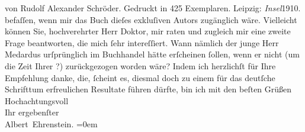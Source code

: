 \begin{ledgroupsized}[t]{13cm}
{{{                     von Rudolf Alexander Schröder. Gedruckt
                     in 425 Exemplaren. Leipzig: \emph{Insel}1910.}}}\label{K_L01912_3h} befaſſen, wenn mir das Buch dieſes exkluſiven Autors zugänglich
               wäre. Vielleicht können Sie, hochverehrter Herr Doktor, mir raten und zugleich mir
               eine zweite Frage beantworten, die mich ſehr intereſſiert. Wann nämlich der junge Herr Medardus urſprünglich im Buchhandel
               hätte erſcheinen ſollen, wenn er nicht (um die Zeit Ihrer \label{K_L01912_4v}\label{K_L01912_4h}?) zurückgezogen worden wäre?\pend
           \pstart
           Indem ich herzlichſt für Ihre Empfehlung danke, die, ſcheint es, diesmal doch zu
               einem für das deutſche Schrifttum erfreulichen Resultate führen dürfte, bin ich mit den beſten Grüßen\pend
           \pstart
           Hochachtungsvoll{\\[\baselineskip]}Ihr ergebenſter{\\[\baselineskip]}\spacefill\mbox{Albert Ehrenstein.}\pend
           \leftskip=0em{}
         
         \endnumbering{}\end{ledgroupsized}  \newcommand{\dateiname}{L01912}\newcommand{\titel}{Albert Ehrenstein an Arthur Schnitzler, 10. 2. 1910}\newcommand{\editorInnen}{Martin Anton Müller und Gerd-Hermann Susen}
      